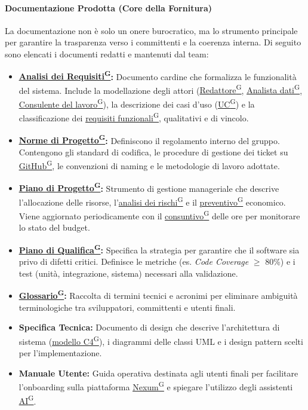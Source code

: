 \documentclass[a4paper,12pt]{article}
\providecommand{\glslink}[2]{\href{https://alittlebyte-19.github.io/Documentazione/glossario.html\#gls-#1}{\underline{#2}\textsuperscript{\scriptsize G}}}
\begin{document}
\paragraph{Documentazione Prodotta (Core della Fornitura)}
La documentazione non è solo un onere burocratico, ma lo strumento principale per garantire la trasparenza verso i committenti e la coerenza interna. Di seguito sono elencati i documenti redatti e mantenuti dal team:
\begin{itemize}
    \item \textbf{\glslink{analisi-dei-requisiti-adr}{Analisi dei Requisiti}:} Documento cardine che formalizza le funzionalità del sistema. Include la modellazione degli attori (\glslink{redattore}{Redattore}, \glslink{analista-dati}{Analista dati}, \glslink{consulente-del-lavoro-cdl}{Consulente del lavoro}), la descrizione dei casi d'uso (\glslink{caso-d-uso-uc}{UC}) e la classificazione dei \glslink{requisiti-funzionali}{requisiti funzionali}, qualitativi e di vincolo.
    \item \textbf{\glslink{norme-di-progetto}{Norme di Progetto}:} Definiscono il regolamento interno del gruppo. Contengono gli standard di codifica, le procedure di gestione dei ticket su \glslink{github}{GitHub}, le convenzioni di naming e le metodologie di lavoro adottate.
    \item \textbf{\glslink{piano-di-progetto}{Piano di Progetto}:} Strumento di gestione manageriale che descrive l'allocazione delle risorse, l'\glslink{analisi-dei-rischi}{analisi dei rischi} e il \glslink{preventivo}{preventivo} economico. Viene aggiornato periodicamente con il \glslink{consuntivo}{consuntivo} delle ore per monitorare lo stato del budget.
    \item \textbf{\glslink{piano-di-qualifica}{Piano di Qualifica}:} Specifica la strategia per garantire che il software sia privo di difetti critici. Definisce le metriche (es. \textit{Code Coverage} $\geq$ 80\%) e i test (unità, integrazione, sistema) necessari alla validazione.
    \item \textbf{\glslink{glossario}{Glossario}:} Raccolta di termini tecnici e acronimi per eliminare ambiguità terminologiche tra sviluppatori, committenti e utenti finali.
    \item \textbf{Specifica Tecnica:} Documento di design che descrive l'architettura di sistema (\glslink{modello-c4}{modello C4}), i diagrammi delle classi UML e i design pattern scelti per l'implementazione.
    \item \textbf{Manuale Utente:}  Guida operativa destinata agli utenti finali per facilitare l'onboarding sulla piattaforma \glslink{nexum}{Nexum} e spiegare l'utilizzo degli assistenti \glslink{intelligenza-artificiale-ai}{AI}.

\end{itemize}
\end{document}
